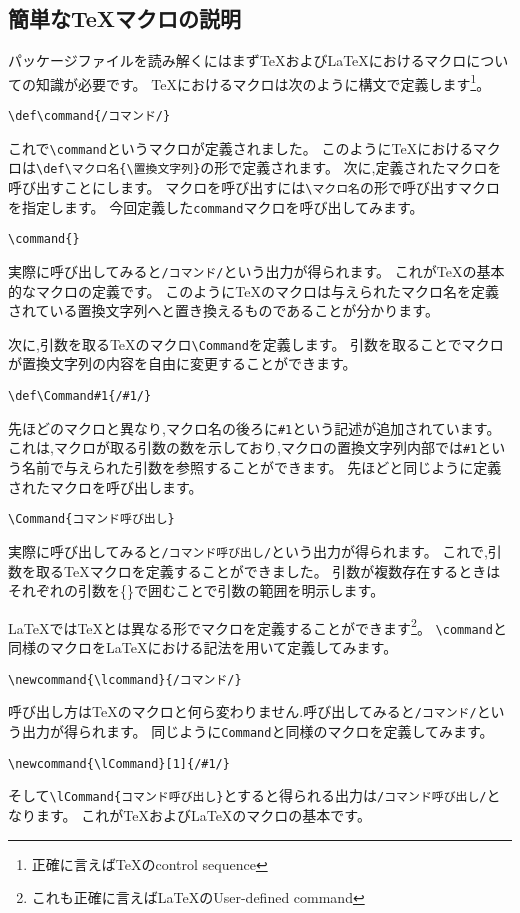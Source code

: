 \subsection{簡単な{\TeX}マクロの説明}
\newcommand{\lcommand}{/コマンド/}
\newcommand{\lCommand}[1]{/#1/}
{
\def\command{/コマンド/}
\def\Command#1{/#1/}

パッケージファイルを読み解くにはまず{\TeX}および{\LaTeX}におけるマクロについての知識が必要です。
{\TeX}におけるマクロは次のように構文で定義します\footnote{正確に言えば{\TeX}のcontrol sequence}。
\begin{verbatim}
\def\command{/コマンド/}
\end{verbatim}
これで\verb|\command|というマクロが定義されました。
このように{\TeX}におけるマクロは\verb|\def\マクロ名{\置換文字列}|の形で定義されます。
次に,定義されたマクロを呼び出すことにします。
マクロを呼び出すには\verb|\マクロ名|の形で呼び出すマクロを指定します。
今回定義した\verb|command|マクロを呼び出してみます。
\begin{verbatim}
\command{}
\end{verbatim}
実際に呼び出してみると\texttt{\command{}}という出力が得られます。
これが{\TeX}の基本的なマクロの定義です。
このように{\TeX}のマクロは与えられたマクロ名を定義されている置換文字列へと置き換えるものであることが分かります。

次に,引数を取る{\TeX}のマクロ\verb|\Command|を定義します。
引数を取ることでマクロが置換文字列の内容を自由に変更することができます。
\begin{verbatim}
\def\Command#1{/#1/}
\end{verbatim}
先ほどのマクロと異なり,マクロ名の後ろに\verb|#1|という記述が追加されています。
これは,マクロが取る引数の数を示しており,マクロの置換文字列内部では\verb|#1|という名前で与えられた引数を参照することができます。
先ほどと同じように定義されたマクロを呼び出します。
\begin{verbatim}
\Command{コマンド呼び出し}
\end{verbatim}
実際に呼び出してみると\texttt{\Command{コマンド呼び出し}}という出力が得られます。
これで,引数を取る{\TeX}マクロを定義することができました。
引数が複数存在するときはそれぞれの引数を\{\}で囲むことで引数の範囲を明示します。

{\LaTeX}では{\TeX}とは異なる形でマクロを定義することができます\footnote{これも正確に言えば{\LaTeX}のUser-defined command}。
\verb|\command|と同様のマクロを{\LaTeX}における記法を用いて定義してみます。
\begin{verbatim}
\newcommand{\lcommand}{/コマンド/}
\end{verbatim}
}
呼び出し方は{\TeX}のマクロと何ら変わりません.呼び出してみると\texttt{\lcommand{}}という出力が得られます。
同じように\verb|Command|と同様のマクロを定義してみます。
\begin{verbatim}
\newcommand{\lCommand}[1]{/#1/}
\end{verbatim}
そして\verb|\lCommand{コマンド呼び出し}|とすると得られる出力は\texttt{\lCommand{コマンド呼び出し}}となります。
これが{\TeX}および{\LaTeX}のマクロの基本です。

